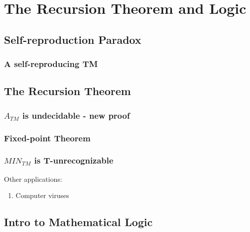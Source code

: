 \chapter{The Recursion Theorem and Logic}

\section{Self-reproduction Paradox}

\subsection{A self-reproducing TM}
\begin{theorem}
    
\end{theorem}

\begin{example}
    
\end{example}

\section{The Recursion Theorem}

\begin{theorem}
    
\end{theorem}

\subsection{\(A_{TM}\) is undecidable - new proof}
    

\subsection{Fixed-point Theorem}

\subsection{\(MIN_{TM}\) is T-unrecognizable}

Other applications:
\begin{enumerate}
    \item Computer viruses
\end{enumerate}

\section{Intro to Mathematical Logic}
\begin{definition}[Goal]
    
\end{definition}


\begin{example}
    
\end{example}

